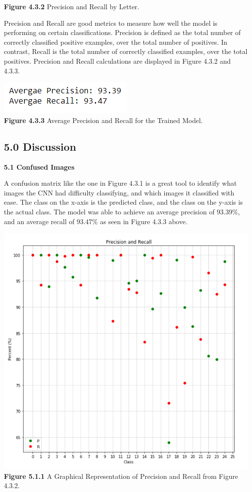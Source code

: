 \documentclass[11pt]{article}
\begin{document}
\begin{multicols}{2}
\begin{center}
\textbf{Figure 4.3.2} Precision and Recall by Letter.
\end{center}
\par
Precision and Recall are good metrics to measure how well the model is performing on certain classifications.  Precision is defined as the total number of correctly classified positive examples, over the total number of positives.  In contrast, Recall is the total number of correctly classified examples, over the total positives.  Precision and Recall calculations are displayed in Figure 4.3.2 and 4.3.3.
\begin{center}
\includegraphics[scale=1]{AvgPR} \\
\textbf{Figure 4.3.3} Average Precision and Recall for the Trained Model.
\end{center}
\subsection*{5.0 Discussion}
\textbf{5.1 Confused Images}
\par
A confusion matrix like the one in Figure 4.3.1 is a great tool to identify what images the CNN had difficulty classifying, and which images it classified with ease.  The class on the x-axis is the predicted class, and the class on the y-axis is the actual class.  The model was able to achieve an average precision of 93.39\%, and an average recall of 93.47\% as seen in Figure 4.3.3 above.  
\begin{center}
\includegraphics[scale=.5]{ChartPR}
\textbf{Figure 5.1.1} A Graphical Representation of Precision and Recall from Figure 4.3.2.
\end{center}


\end{multicols}
\end{document}

